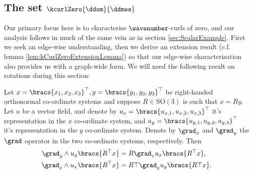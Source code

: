 \subsection{The set $\kcurlZero{\ddom}{\ddmes}$} \label{sec:ktCurlsZero}
Our primary focus here is to characterise $\wavenumber$-curls of zero, and our analysis follows in much of the same vein as in section \ref{sec:ScalarExample}.
First we seek an edge-wise understanding, then we derive an extension result (c.f. lemma \ref{lem:kCurlZeroExtensionLemma}) so that our edge-wise characterisation also provides us with a graph-wide form.
We will need the following result on rotations during this section:
\begin{lemma} \label{lem:CurlUnderRotation}
	Let $x=\bracs{x_1,x_2,x_3}^\top, y=\bracs{y_1,y_2,y_3}^\top$ be right-handed orthonormal co-ordinate systems and suppose $R\in\mathrm{SO}(3)$ is such that $x=Ry$.
	Let $u$ be a vector field, and denote by $u_x =\bracs{u_{x,1},u_{x,2},u_{x,3}}^\top$ it's representation in the $x$ co-ordinate system, and $u_y =\bracs{u_{y,1},u_{y,2},u_{y,3}}^\top$ it's representation in the $y$ co-ordinate system.
	Denote by $\grad_x$ and $\grad_y$ the $\grad$ operator in the two co-ordinate systems, respectively.
	Then
	\begin{align*}
		\grad_y\wedge u_y\bracs{R^\top x} &= R \grad_x u_x\bracs{R^\top x}, \\
		\grad_x\wedge u_x\bracs{R^\top x} &= R\top\grad_y u_y\bracs{R\top x}.
	\end{align*}
\end{lemma}
